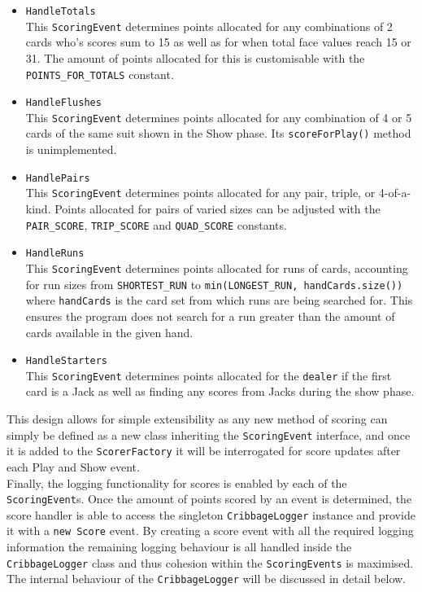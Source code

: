 \documentclass{article}
\begin{document}
\begin{multicols}{2}
    \begin{itemize}
        \item \verb|HandleTotals|\\[2mm]
        This \verb|ScoringEvent| determines points allocated for any combinations of 2 cards who's scores sum to 15 as well as for when total face values reach 15 or 31. The amount of points allocated for this is customisable with the \verb|POINTS_FOR_TOTALS| constant.
        \item \verb|HandleFlushes|\\[2mm]
        This \verb|ScoringEvent| determines points allocated for any combination of 4 or 5 cards of the same suit shown in the Show phase. Its \verb|scoreForPlay()| method is unimplemented.
        \item \verb|HandlePairs|\\[2mm]
        This \verb|ScoringEvent| determines points allocated for any pair, triple, or 4-of-a-kind. Points allocated for pairs of varied sizes can be adjusted with the \verb|PAIR_SCORE|, \verb|TRIP_SCORE| and \verb|QUAD_SCORE| constants.
        \item \verb|HandleRuns|\\[2mm]
        This \verb|ScoringEvent| determines points allocated for runs of cards, accounting for run sizes from \verb|SHORTEST_RUN| to \verb|min(LONGEST_RUN, handCards.size())| where \verb|handCards| is the card set from which runs are being searched for. This ensures the program does not search for a run greater than the amount of cards available in the given hand.
        \item \verb|HandleStarters|\\[2mm]
        This \verb|ScoringEvent| determines points allocated for the \verb|dealer| if the first card is a Jack as well as finding any scores from Jacks during the show phase.
    \end{itemize}
\end{multicols}
\noindent This design allows for simple extensibility as any new method of scoring can simply be defined as a new class inheriting the \verb|ScoringEvent| interface, and once it is added to the \verb|ScorerFactory| it will be interrogated for score updates after each Play and Show event.\\[2mm]
Finally, the logging functionality for scores is enabled by each of the \verb|ScoringEvent|s. Once the amount of points scored by an event is determined, the score handler is able to access the singleton \verb|CribbageLogger| instance and provide it with a \verb|new Score| event. By creating a score event with all the required logging information the remaining logging behaviour is all handled inside the \verb|CribbageLogger| class and thus cohesion within the \verb|ScoringEvents| is maximised. The internal behaviour of the \verb|CribbageLogger| will be discussed in detail below.
\end{document}
